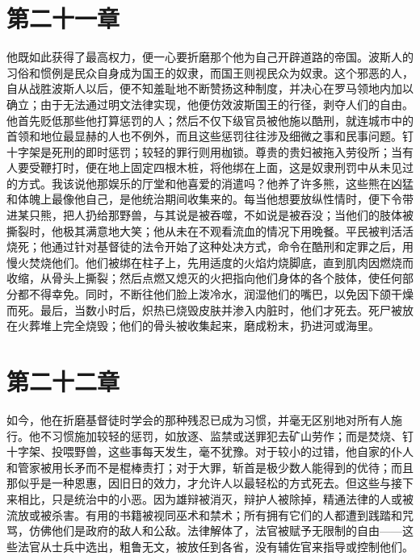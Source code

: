 
\section{第二十一章}

他既如此获得了最高权力，便一心要折磨那个他为自己开辟道路的帝国。波斯人的习俗和惯例是民众自身成为国王的奴隶，而国王则视民众为奴隶。这个邪恶的人，自从战胜波斯人以后，便不知羞耻地不断赞扬这种制度，并决心在罗马领地内加以确立；由于无法通过明文法律实现，他便仿效波斯国王的行径，剥夺人们的自由。他首先贬低那些他打算惩罚的人；然后不仅下级官员被他施以酷刑，就连城市中的首领和地位最显赫的人也不例外，而且这些惩罚往往涉及细微之事和民事问题。钉十字架是死刑的即时惩罚；较轻的罪行则用枷锁。尊贵的贵妇被拖入劳役所；当有人要受鞭打时，便在地上固定四根木桩，将他绑在上面，这是奴隶刑罚中从未见过的方式。我该说他那娱乐的厅堂和他喜爱的消遣吗？他养了许多熊，这些熊在凶猛和体魄上最像他自己，是他统治期间收集来的。每当他想要放纵性情时，便下令带进某只熊，把人扔给那野兽，与其说是被吞噬，不如说是被吞没；当他们的肢体被撕裂时，他极其满意地大笑；他从未在不观看流血的情况下用晚餐。平民被判活活烧死；他通过针对基督徒的法令开始了这种处决方式，命令在酷刑和定罪之后，用慢火焚烧他们。他们被绑在柱子上，先用适度的火焰灼烧脚底，直到肌肉因燃烧而收缩，从骨头上撕裂；然后点燃又熄灭的火把指向他们身体的各个肢体，使任何部分都不得幸免。同时，不断往他们脸上泼冷水，润湿他们的嘴巴，以免因下颌干燥而死。最后，当数小时后，炽热已烧毁皮肤并渗入内脏时，他们才死去。死尸被放在火葬堆上完全烧毁；他们的骨头被收集起来，磨成粉末，扔进河或海里。\par


\section{第二十二章}

如今，他在折磨基督徒时学会的那种残忍已成为习惯，并毫无区别地对所有人施行。他不习惯施加较轻的惩罚，如放逐、监禁或送罪犯去矿山劳作；而是焚烧、钉十字架、投喂野兽，这些事每天发生，毫不犹豫。对于较小的过错，他自家的仆人和管家被用长矛而不是棍棒责打；对于大罪，斩首是极少数人能得到的优待；而且那似乎是一种恩惠，因旧日的效力，才允许人以最轻松的方式死去。但这些与接下来相比，只是统治中的小恶。因为雄辩被消灭，辩护人被除掉，精通法律的人或被流放或被杀害。有用的书籍被视同巫术和禁术；所有拥有它们的人都遭到践踏和咒骂，仿佛他们是政府的敌人和公敌。法律解体了，法官被赋予无限制的自由——这些法官从士兵中选出，粗鲁无文，被放任到各省，没有辅佐官来指导或控制他们。\par

